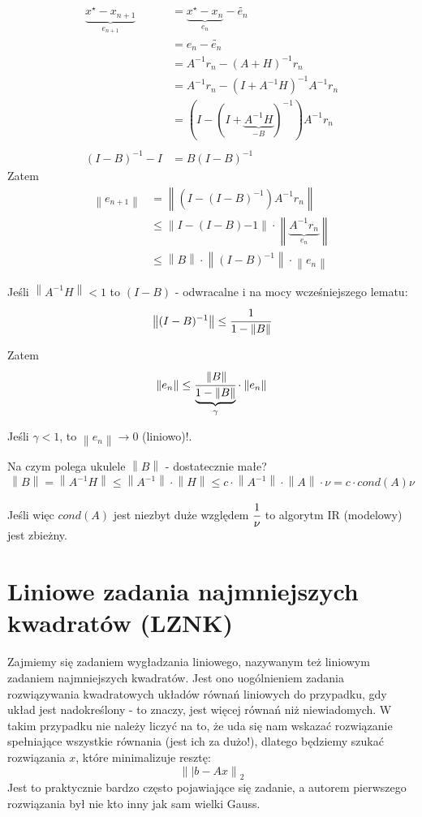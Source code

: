 \documentclass[hidelinks,a4paper,fleqn,oneside]{book}
\newcommand{\ra}{\rightarrow}
\newcommand{\norm}[1]{\left\lVert#1\right\rVert}
\begin{document}
\begin{align*}
	\underbrace{x^\star - x_{n+1}}_{e_{n+1}} & = \underbrace{x^\star - x_n}_{e_n} - \tilde{e_n} \\
	& = e_n - \tilde{e_n} \\
	& = A^{-1}r_n  - (A+H)^{-1}r_n \\
	& = A^{-1}r_n - (I + A^{-1}H)^{-1}A^{-1}r_n \\
	& = (I - (I + \underbrace{A^{-1}H}_{-B})^{-1})A^{-1}r_n \\ \\
	(I - B)^{-1} - I & = B(I - B)^{-1}
\end{align*}
Zatem
\begin{align*}
	\norm{e_{n+1}} & = \norm{(I - (I - B)^{-1})A^{-1} r_n} \\
	& \leq \norm{I - (I - B){-1}} \cdot \norm{\underbrace{A^{-1} r_n}_{e_n}} \\
	& \leq \norm{B} \cdot \norm{(I - B)^{-1}} \cdot \norm{e_n}
\end{align*}

Jeśli $\norm{A^{-1}H} < 1$ to $(I - B)$ - odwracalne i na mocy wcześniejszego lematu:
\[
	\norm{(I - B)^{-1}} \leq \cfrac{1}{1 - \norm{B}}
\]

Zatem
\[
	\norm{e_n} \leq \cfrac{\norm{B}}{\underbrace{1 - \norm{B}}_{\gamma}} \cdot \norm{e_n}
\]

Jeśli $\gamma < 1$, to $\norm{e_n} \ra 0$ (liniowo)!.

Na czym polega ukulele $\norm{B}$ - dostatecznie małe?
\[
	\norm{B} = \norm{A^{-1} H} \leq \norm{A^{-1}} \cdot \norm{H} \leq c \cdot \norm{A^{-1}} \cdot \norm{A} \cdot \nu = c \cdot cond(A) \nu
\]

Jeśli więc $cond(A)$ jest niezbyt duże względem $\cfrac{1}{\nu}$ to algorytm IR (modelowy) jest zbieżny.

\section{Liniowe zadania najmniejszych kwadratów (LZNK)} 
Zajmiemy się zadaniem wygładzania liniowego, nazywanym też liniowym zadaniem najmniejszych kwadratów. Jest ono uogólnieniem zadania rozwiązywania kwadratowych układów równań liniowych do przypadku, gdy układ jest nadokreślony - to znaczy, jest więcej równań niż niewiadomych. W takim przypadku nie należy liczyć na to, że uda się nam wskazać rozwiązanie spełniające wszystkie równania (jest ich za dużo!), dlatego będziemy szukać rozwiązania $x$, które minimalizuje resztę:
\[\norm{|b-Ax}_2\]
Jest to praktycznie bardzo często pojawiające się zadanie, a autorem pierwszego rozwiązania był nie kto inny jak sam wielki Gauss.
\end{document}
